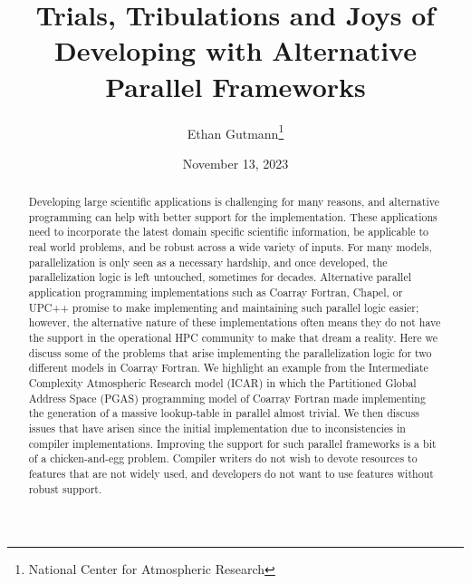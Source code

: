 \documentclass{article}
\title{Trials, Tribulations and Joys of Developing with Alternative Parallel Frameworks}
\author{Ethan Gutmann\thanks{National Center for Atmospheric Research}}
\date{November 13, 2023}
\providecommand{\keywords}[1]{\textbf{\textit{Keywords---}} #1}
\begin{document}
\maketitle

\begin{abstract}
    Developing large scientific applications is challenging for many reasons, and alternative programming can help with better support for the implementation.  These applications need to incorporate the latest domain specific scientific information, be applicable to real world problems, and be robust across a wide variety of inputs.  For many models, parallelization is only seen as a necessary hardship, and once developed, the parallelization logic is left untouched, sometimes for decades.  Alternative parallel application programming implementations such as Coarray Fortran, Chapel, or UPC++ promise to make implementing and maintaining such parallel logic easier; however, the alternative nature of these implementations often means they do not have the support in the operational HPC community to make that dream a reality. Here we discuss some of the problems that arise implementing the parallelization logic for two different models in Coarray Fortran. We highlight an example from the Intermediate Complexity Atmospheric Research model (ICAR) in which the Partitioned Global Address Space (PGAS) programming model of Coarray Fortran made implementing the generation of a massive lookup-table in parallel almost trivial.  We then discuss issues that have arisen since the initial implementation due to inconsistencies in compiler implementations. Improving the support for such parallel frameworks is a bit of a chicken-and-egg problem.  Compiler writers do not wish to devote resources to features that are not widely used, and developers do not want to use features without robust support. 
    
\end{abstract}

\end{document}
